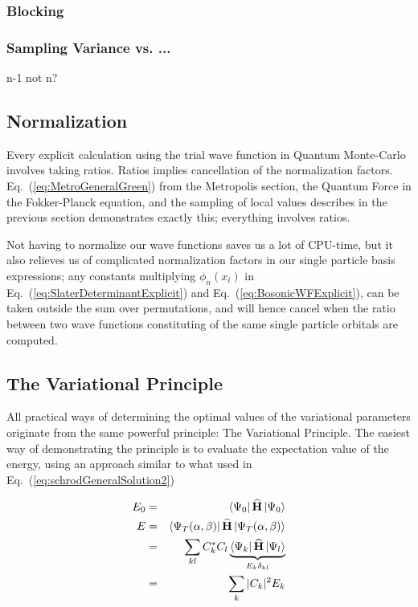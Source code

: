 \subsubsection{Blocking}

\subsubsection{Sampling Variance vs. ...}
n-1 not n?

\subsection{Normalization}

Every explicit calculation using the trial wave function in Quantum Monte-Carlo involves taking ratios. Ratios implies cancellation of the normalization factors. Eq.~(\ref{eq:MetroGeneralGreen}) from the Metropolis section, the Quantum Force in the Fokker-Planck equation, and the sampling of local values describes in the previous section demonstrates exactly this; everything involves ratios.

Not having to normalize our wave functions saves us a lot of CPU-time, but it also relieves us of complicated normalization factors in our single particle basis expressions; any constants multiplying $\phi_n(x_i)$ in Eq.~(\ref{eq:SlaterDeterminantExplicit}) and Eq.~(\ref{eq:BosonicWFExplicit}), can be taken outside the sum over permutations, and will hence cancel when the ratio between two wave functions constituting of the same single particle orbitals are computed.


\subsection{The Variational Principle}
\label{sec:VarPrince}

All practical ways of determining the optimal values of the variational parameters originate from the same powerful principle: The Variational Principle. The easiest way of demonstrating the principle is to evaluate the expectation value of the energy, using an approach similar to what used in Eq.~(\ref{eq:schrodGeneralSolution2})

\begin{eqnarray*}
 E_0 &=& \left< \Psi_0 \right|{\bf\widehat{H}}\left| \Psi_0 \right>  \\
 E   &=& \left< \Psi_T(\alpha, \beta) \right|{\bf\widehat{H}}\left| \Psi_T(\alpha, \beta) \right>\\
     &=& \sum_{kl} C_k^\ast C_l \underbrace{\left< \Psi_k \right|{\bf\widehat{H}}\left| \Psi_l \right>}_{E_k\delta_{kl}} \\
     &=& \sum_k |C_k|^2E_k
\end{eqnarray*}

